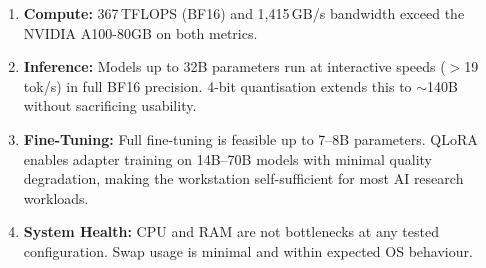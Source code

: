 \documentclass[11pt,a4paper]{article}
\begin{document}
\begin{enumerate}
  \item \textbf{Compute:} 367\,TFLOPS (BF16) and 1{,}415\,GB/s bandwidth
        exceed the NVIDIA A100-80GB on both metrics.
  \item \textbf{Inference:} Models up to 32B parameters run at interactive
        speeds ($>$19\,tok/s) in full BF16 precision. 4-bit quantisation
        extends this to $\sim$140B without sacrificing usability.
  \item \textbf{Fine-Tuning:} Full fine-tuning is feasible up to 7--8B
        parameters. QLoRA enables adapter training on 14B--70B models with
        minimal quality degradation, making the workstation self-sufficient
        for most AI research workloads.
  \item \textbf{System Health:} CPU and RAM are not bottlenecks at any tested
        configuration. Swap usage is minimal and within expected OS behaviour.
\end{enumerate}
\end{document}
